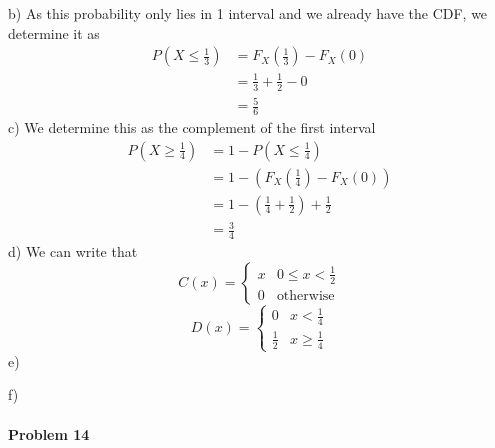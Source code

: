 b)
As this probability only lies in 1 interval and we already have the CDF, we determine it as
\begin{align*}
    P\left(X\leq\frac{1}{3}\right)&=F_{X}\left(\frac{1}{3}\right)-F_{X}(0) \\
          &=\frac{1}{3}+\frac{1}{2}-0 \\
          &=\frac{5}{6}
\end{align*}
c)
We determine this as the complement of the first interval
\begin{align*}
    P\left(X\geq \frac{1}{4}\right)&=1-P\left(X\leq\frac{1}{4}\right) \\
           &=1-\left(F_{X}\left(\frac{1}{4}\right)-F_{X}(0)\right) \\
           &=1-\left(\frac{1}{4}+\frac{1}{2}\right)+\frac{1}{2} \\
           &=\frac{3}{4}
\end{align*}
d)
We can write that
\[
    C(x)=\begin{cases}x & 0\leq x<\frac{1}{2} \\ 0 & \text{otherwise}\end{cases}
\]
\[
    D(x)=\begin{cases}0 & x<\frac{1}{4} \\ \frac{1}{2} & x\geq\frac{1}{4}\end{cases}
\]
e)

f)

\paragraph{Problem 14}
